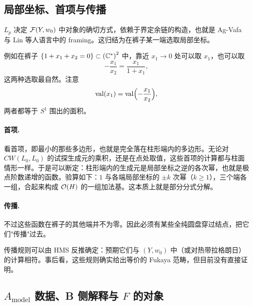 \subsection{局部坐标、首项与传播}

$L_p$ 决定 $\mathcal{F}(Y,w_0)$ 中对象的确切方式，依赖于界定余链的构造，也就是 Ag-Vafa 与 Lin 等人语言中的 framing。这归结为在裤子某一端选取局部坐标。

例如在裤子 $\{1+x_1+x_2=0\}\subset\left(\mathbb{C}^*\right)^2$ 中，靠近 $x_1\to0$ 处可以取 $x_1$，也可以取
\[
-\frac{x_1}{x_2}=\frac{x_1}{1+x_1},
\]
这两种选取最自然。注意
\[
\operatorname{val}(x_1)=\operatorname{val}\Bigl(-\frac{x_1}{x_2}\Bigr),
\]
两者都等于 $S^1$ 围出的面积。

\paragraph{首项.} 看首项，即最小的那些多边形，也就是完全落在柱形端内的多边形。无论对 $CW(L_0,L_0)$ 的试探生成元的乘积，还是在点处取值，这些首项的计算都与柱面情形一样。于是可以断定：柱形端内的生成元是局部坐标之逆的各次幂，也就是极点阶数递增的函数。验算如下：$1$ 与各端局部坐标的 $\pm k$ 次幂（$k\ge1$），三个端各一组，合起来构成 $\mathcal{O}(H)$ 的一组加法基。这本质上就是部分分式分解。

\paragraph{传播.} 不过这些函数在裤子的其他端并不为零。因此必须有某些全纯圆盘穿过结点，把它们"传播"过去。

传播规则可以由 HMS 反推确定：预期它们与 $(Y,w_0)$ 中（或对热带拉格朗日）的计算相符。事后看，这些规则确实给出等价的 Fukaya 范畴，但目前没有直接证明。

\subsection{\texorpdfstring{$A_{\mathrm{model}}$ 数据、B 侧解释与 $F$ 的对象}{A-model 数据、B 侧解释与 F 的对象}}

